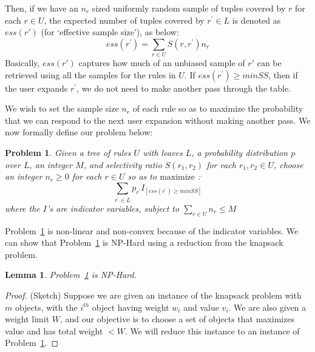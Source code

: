 \documentclass[10pt,journal,compsoc]{IEEEtran}
\newtheorem{lemma}{Lemma}
\newcounter{prob}
\newtheorem{problem}[prob]{Problem}
\begin{document}
{Then, if we have an $n_r$ sized uniformly random sample of tuples covered by $r$ for each $r \in U$, the expected number of tuples covered by $r^{\prime} \in L$ is denoted as $ess(r')$ (for `effective sample size'), as below: 
\begin{equation} \label{def:ess}
ess(r^{\prime}) = \sum_{r \in U} S(r, r^{\prime})n_r
\end{equation}
Basically, $ess(r')$ captures how much of an unbiased sample of $r'$ can be retrieved using all the samples for the rules in $U$.
If $ess(r^{\prime}) \geq minSS$, then if the user expands $r^{\prime}$, we do not need to make another 
pass through the table.

We wish to set the sample size $n_r$ of each rule so as to maximize the probability that we can respond to the next user expansion without making another pass. We now formally define our problem below:
\begin{problem}\label{prob:sample-sizes}
Given a tree of rules $U$ with leaves $L$, a probability distribution $p$ over $L$, an integer $M$, and selectivity ratio $S(r_1, r_2)$ for each $r_1, r_2 \in U$, 
choose an integer $n_r \geq 0$ for each $r \in U$ so as to $\textrm{maximize}$ :
$$\sum_{r^{\prime} \in L} p_{r^{\prime}}I_{[ess(r^{\prime}) \geq minSS]}$$
where the $I$'s are indicator variables, subject to
$\sum_{r \in U} n_r \leq M$
\end{problem}
Problem~\ref{prob:sample-sizes} is non-linear and non-convex because of the indicator variables. 
We can show that Problem~\ref{prob:sample-sizes} is {\sc NP-Hard} using a reduction from the knapsack problem. 
\begin{lemma}\label{lemma:sampling-hardness}
Problem~\ref{prob:sample-sizes} is {\sc NP-Hard}.
\end{lemma}
\begin{proof}(Sketch)
Suppose we are given an instance of the knapsack problem with $m$ objects, with the $i^{th}$ object having weight $w_i$ and value $v_i$. We are also given a weight limit $W$, and our objective is to choose a set of objects that maximizes value and has total weight $< W$. We will reduce this instance to an instance of Problem~\ref{prob:sample-sizes}.


\end{proof}}
\end{document}
